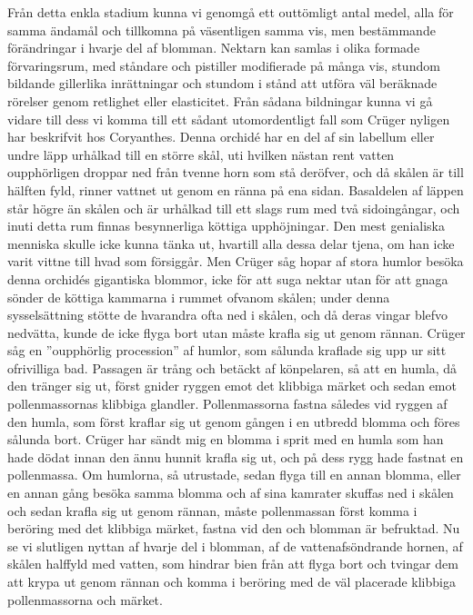 Från detta enkla stadium kunna vi genomgå ett outtömligt antal medel, alla för samma ändamål och tillkomna på väsentligen samma vis, men bestämmande förändringar i hvarje del af blomman. Nektarn kan samlas i olika formade förvaringsrum, med ståndare och pistiller modifierade på många vis, stundom bildande gillerlika inrättningar och stundom i stånd att utföra väl beräknade rörelser genom retlighet eller elasticitet. Från sådana bildningar kunna vi gå vidare till dess vi komma till ett sådant utomordentligt fall som Crüger nyligen har beskrifvit hos Coryanthes. Denna orchidé har en del af sin labellum eller undre läpp urhålkad till en större skål, uti hvilken nästan rent vatten oupphörligen droppar ned från tvenne horn som stå deröfver, och då skålen är till hälften fyld, rinner vattnet ut genom en ränna på ena sidan. Basaldelen af läppen står högre än skålen och är urhålkad till ett slags rum med två sidoingångar, och inuti detta rum finnas besynnerliga köttiga upphöjningar. Den mest genialiska menniska skulle icke kunna tänka ut, hvartill alla dessa delar tjena, om han icke varit vittne till hvad som försiggår. Men Crüger såg hopar af stora humlor besöka denna orchidés gigantiska blommor, icke för att suga nektar utan för att gnaga sönder de köttiga kammarna i rummet ofvanom skålen; under denna sysselsättning stötte de hvarandra ofta ned i skålen, och då deras vingar blefvo nedvätta, kunde de icke flyga bort utan måste krafla sig ut genom rännan. Crüger såg en ”oupphörlig procession” af humlor, som sålunda kraflade sig upp ur sitt ofrivilliga bad. Passagen är trång och betäckt af könpelaren, så att en humla, då den tränger sig ut, först gnider ryggen emot det klibbiga märket och sedan emot pollenmassornas klibbiga glandler. Pollenmassorna fastna således vid ryggen af den humla, som först kraflar sig ut genom gången i en utbredd blomma och föres sålunda bort. Crüger har sändt mig en blomma i sprit med en humla som han hade dödat innan den ännu hunnit krafla sig ut, och på dess rygg hade fastnat en pollenmassa. Om humlorna, så utrustade, sedan flyga till en annan blomma, eller en annan gång besöka samma blomma och af sina kamrater skuffas ned i skålen och sedan krafla sig ut genom rännan, måste pollenmassan först komma i beröring med det klibbiga märket, fastna vid den och blomman är befruktad. Nu se vi slutligen nyttan af hvarje del i blomman, af de vattenafsöndrande hornen, af skålen halffyld med vatten, som hindrar bien från att flyga bort och tvingar dem att krypa ut genom rännan och komma i beröring med de väl placerade klibbiga pollenmassorna och märket.

